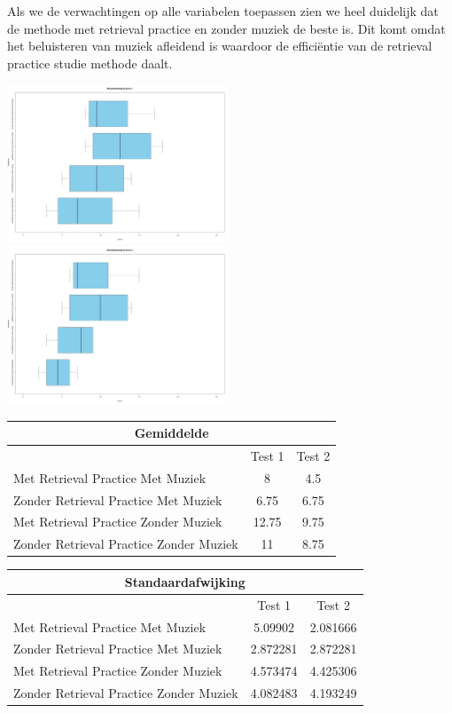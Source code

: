 \documentclass{hogent-article}
\begin{document}
	Als we de verwachtingen op alle variabelen toepassen zien we heel duidelijk dat de methode met retrieval practice en zonder muziek de beste is. Dit komt omdat het beluisteren van muziek afleidend is waardoor de efficiëntie van de retrieval practice studie methode daalt. 
   
	\includegraphics[width=250px]{Verwacht_MuziekRT_Score1}
	\includegraphics[width=250px]{Verwacht_MuziekRT_Score2}
	\begin{tabular}{ |p{10em}|c|c| }
	\hline
		\multicolumn{3}{|c|}{Gemiddelde} \\
	\hline
		& Test 1 & Test 2 \\
	\hline
		Met Retrieval Practice Met Muziek  & 8 & 4.5 \\
	\hline
		Zonder Retrieval Practice Met Muziek & 6.75 & 6.75 \\
	\hline
		Met Retrieval Practice Zonder Muziek & 12.75  & 9.75 \\
	\hline
		Zonder Retrieval Practice Zonder Muziek & 11 & 8.75 \\
	\hline
	\end{tabular}
	
	\begin{tabular}{ |p{10em}|c|c| }
	\hline
		\multicolumn{3}{|c|}{Standaardafwijking} \\
	\hline
		& Test 1 & Test 2 \\
	\hline
		Met Retrieval Practice Met Muziek  & 5.09902 & 2.081666 \\
	\hline
		Zonder Retrieval Practice Met Muziek & 2.872281 & 2.872281 \\
	\hline
		Met Retrieval Practice Zonder Muziek & 4.573474  & 4.425306 \\
	\hline
		Zonder Retrieval Practice Zonder Muziek & 4.082483 & 4.193249 \\
	\hline
	\end{tabular}
			
\end{document}
